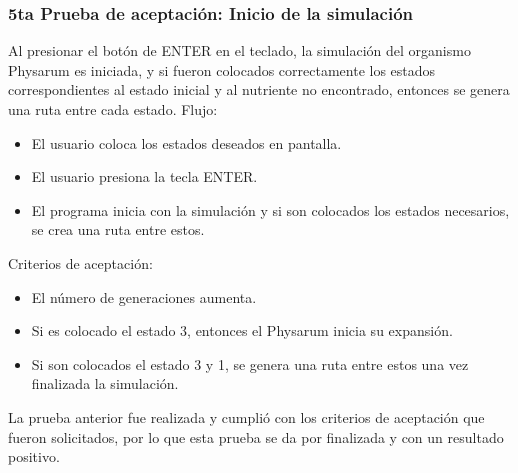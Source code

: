     \subsubsection{5ta Prueba de aceptaci\'on: Inicio de la simulaci\'on}
    Al presionar el bot\'on de ENTER en el teclado, la simulaci\'on del organismo Physarum es iniciada, y si fueron colocados
        correctamente los estados correspondientes al estado inicial
        y al nutriente no encontrado, entonces se genera una ruta
        entre cada estado.
    \vskip 0.5cm
    Flujo:
    \begin{itemize}
        \item El usuario coloca los estados deseados en pantalla.
        \item El usuario presiona la tecla ENTER.
        \item El programa inicia con la simulaci\'on y si son colocados
        los estados necesarios, se crea una ruta entre estos.
    \end{itemize}
    \vskip 0.5cm
    Criterios de aceptaci\'on:
    \begin{itemize}
        \item El n\'umero de generaciones aumenta.
        \item Si es colocado el estado 3, entonces el Physarum inicia
        su expansi\'on.
        \item Si son colocados el estado 3 y 1, se genera una ruta entre
        estos una vez finalizada la simulaci\'on.
    \end{itemize}
    \vskip 0.5cm
    La prueba anterior fue realizada y cumpli\'o con los criterios
        de aceptaci\'on que fueron solicitados, por lo que esta prueba
        se da por finalizada y con un resultado positivo.